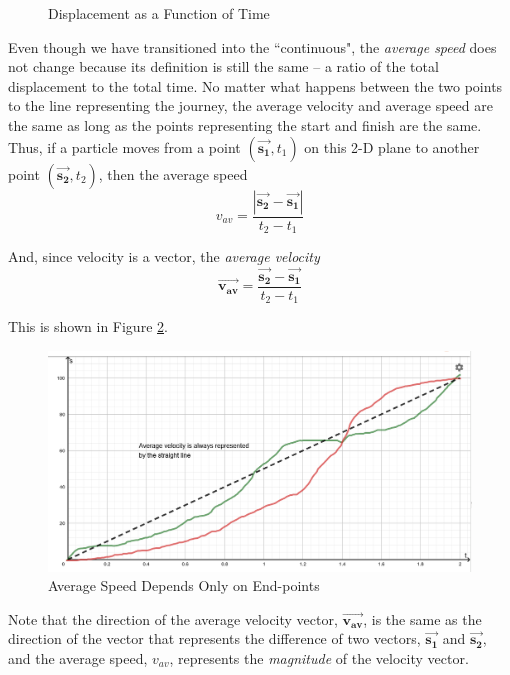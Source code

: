 \documentclass[12pt,a4paper]{book}
\newcommand{\vect}[1]{\pmb{\vec{#1}}}
\begin{document}
\begin{enumerate}
\begin{enumerate}
\begin{figure}[h!]
                            \caption{Displacement as a Function of Time}
                            \label{fig: displacement-as-a-function-of-time}
                        \end{figure}
                Even though we have transitioned into the ``continuous", the \emph{average speed} does not change because its definition is still the same -- a ratio of the total displacement to the total time. No matter what happens between the two points to the line representing the journey, the average velocity and average speed are the same as long as the points representing the start and finish are the same. Thus, if a particle moves from a point $(\vect{s_1}, t_1)$ on this 2-D plane to another point $(\vect{s_2}, t_2)$, then the average speed
                $$
                    v_{av} = \frac{|\vect{s_2}-\vect{s_1}|}{t_2-t_1}
                $$
                
                And, since velocity is a vector, the \emph{average velocity}
                $$
                    \vect{v_{av}} = \frac{\vect{s_2}-\vect{s_1}}{t_2-t_1}
                $$

                This is shown in Figure \ref{fig: average-speed-depends-only-on-end-points}. 
                        \begin{figure}[h!]
                            \centering
                            \includegraphics[width=0.6\linewidth]{average-velocity-only-depends-on-end-points.png}
                            \caption{Average Speed Depends Only on End-points}
                            \label{fig: average-speed-depends-only-on-end-points}
                        \end{figure}
                
                Note that the direction of the average velocity vector, $\vect{v_{av}}$, is the same as the direction of the vector that represents the difference of two vectors, $\vect{s_1}$ and $\vect{s_2}$, and the average speed, $v_{av}$, represents the \emph{magnitude} of the velocity vector.


\end{enumerate}
\end{enumerate}
\end{document}
